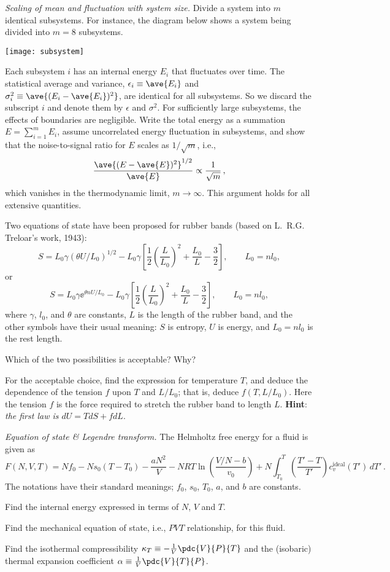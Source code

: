 {\sl Scaling of mean and fluctuation with system size.}
Divide a system into $m$ identical subsystems. For instance,
the diagram below shows a system being divided into $m=8$ subsystems.\par
\centerline{\texttt{[image: subsystem]}}\smallskip
\noindent Each subsystem $i$ has an internal energy $E_i$ that fluctuates over time.
The statistical average and variance, $\epsilon_i\equiv\ave{E_i}$ and
$\sigma^2_i \equiv \ave{(E_i - \ave{E_i})^2}$,
are identical for all subsystems.
So we discard the subscript $i$ and denote them by $\epsilon$ and $\sigma^2$.
For sufficiently large subsystems,
the effects of boundaries are negligible.
Write the total energy as a summation $E = \sum_{i=1}^m E_i$,
assume uncorrelated energy fluctuation in subsystems,
and show that the noise-to-signal ratio for $E$ scales as $1/\sqrt{m}$,
i.e.,
$$ \frac{\ave{(E - \ave{E})^2}^{1/2}}{\ave{E}} \propto \frac{1}{\sqrt{m}}\,, $$
which vanishes in the thermodynamic limit, $m\to\infty$.
This argument holds for all extensive quantities.

\bigskip{}
Two equations of state have been proposed for rubber bands (based on L.~R.G. Treloar's work, 1943):
$$ S = L_0 \gamma(\theta U/L_0)^{1/2} - L_0\gamma\left[
\frac{1}{2}\left(\frac{L}{L_0}\right)^2 + \frac{L_0}{L} - \frac{3}{2}\right],\qquad L_0=nl_0,$$
or
$$ S = L_0 \gamma\ee^{\theta n U/L_0} - L_0\gamma\left[
\frac{1}{2}\left(\frac{L}{L_0}\right)^2 + \frac{L_0}{L} - \frac{3}{2}\right],\qquad L_0=nl_0,$$
where $\gamma$, $l_0$, and $\theta$ are constants, $L$ is the length of the rubber band,
and the other symbols have their usual meaning: $S$ is entropy, $U$ is energy,
and $L_0 = n l_0$ is the rest length.

\smallskip
\subp Which of the two possibilities is acceptable? Why?

\smallskip
\subp
For the acceptable choice, find the expression for temperature $T$,
and deduce the dependence of the tension $f$ upon $T$ and $L/L_0$;
that is, deduce $f(T,L/L_0)$.
Here the tension $f$ is the force required to stretch the rubber band to length $L$.
{\bf Hint}: {\sl the first law is $dU = T dS + f d L$\/}.

\bigskip{}
{\sl Equation of state \& Legendre transform.}
The Helmholtz free energy for a fluid is given as
$$ F(N, V, T) = Nf_0 - Ns_0(T-T_0) - \frac{a N^2}{V} - NRT\ln\left(\frac{V/N-b}{v_0}\right)
+ N \int_{T_0}^T\left(\frac{T'-T}{T'}\right)c_v^\text{ideal}(T') \, dT' \,. $$
The notations have their standard meanings;
$f_0$, $s_0$, $T_0$, $a$, and $b$ are constants.

\smallskip\subp Find the internal energy expressed in terms of $N$, $V$ and $T$.

\smallskip\subp Find the mechanical equation of state, i.e., $PVT$ relationship, for this fluid.

\smallskip\subp Find the isothermal compressibility
$\kappa_T \equiv -\frac{1}{V}\pdc{V}{P}{T}$
and the (isobaric) thermal expansion coefficient $\alpha \equiv \frac{1}{V} \pdc{V}{T}{P}$.



